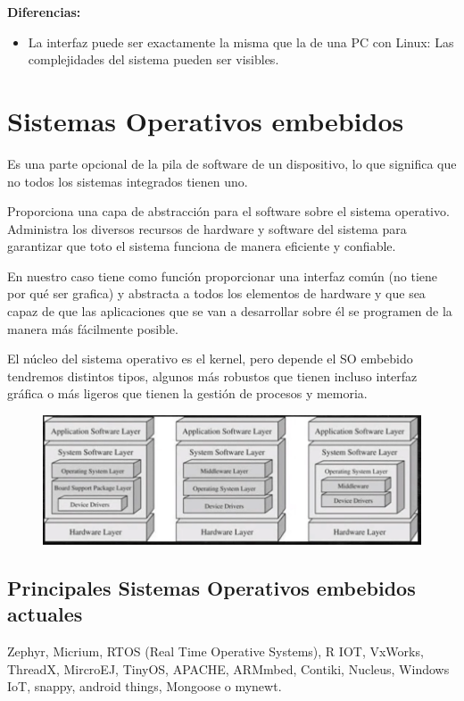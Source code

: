 \documentclass[12pt]{report} %
\begin{document}
\textbf{Diferencias:}
\begin{itemize}
	\item La interfaz puede ser exactamente la misma que la de una PC con Linux: Las complejidades del sistema pueden ser visibles.
\end{itemize}

\section{Sistemas Operativos embebidos}
Es una parte opcional de la pila de software de un dispositivo, lo que significa que no todos los sistemas integrados tienen uno.

Proporciona una capa de abstracción para el software sobre el sistema operativo.
Administra los diversos recursos de hardware y software del sistema para garantizar que toto el sistema funciona de manera eficiente y confiable.

En nuestro caso tiene como función proporcionar una interfaz común (no tiene por qué ser grafica) y abstracta a todos los elementos de hardware y que sea capaz de que las aplicaciones que se van a desarrollar sobre él se programen de la manera más fácilmente posible.

El núcleo del sistema operativo es el kernel, pero depende el SO embebido tendremos distintos tipos, algunos más robustos que tienen incluso interfaz gráfica o más ligeros que tienen la gestión de procesos y memoria.

\begin{figure}[H]
	{\includegraphics[scale=.6]{2021-03-25 09_19_18-2021-03-24 16-59-20.mkv.png}}
\end{figure}

\subsection{Principales Sistemas Operativos embebidos actuales} 
Zephyr, Micrium, RTOS (Real Time Operative Systems), R IOT, VxWorks, ThreadX, MircroEJ, TinyOS, APACHE, ARMmbed, Contiki, Nucleus, Windows IoT, snappy, android things, Mongoose o mynewt.
\end{document}
